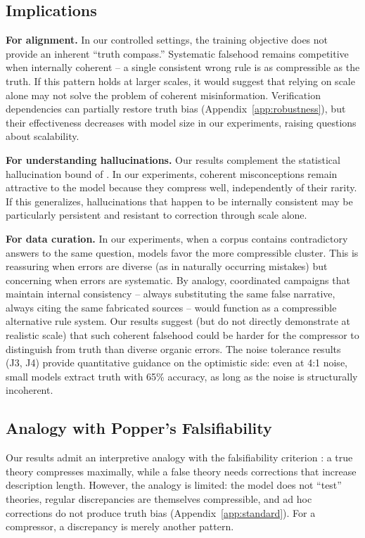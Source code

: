 \documentclass[10pt]{article} %
\begin{document}
\subsection{Implications}

\textbf{For alignment.} In our controlled settings, the training objective does not provide an inherent ``truth compass.'' Systematic falsehood remains competitive when internally coherent -- a single consistent wrong rule is as compressible as the truth. If this pattern holds at larger scales, it would suggest that relying on scale alone may not solve the problem of coherent misinformation. Verification dependencies can partially restore truth bias (Appendix~\ref{app:robustness}), but their effectiveness decreases with model size in our experiments, raising questions about scalability.

\textbf{For understanding hallucinations.} Our results complement the statistical hallucination bound of \citet{kalai2024calibrated}. In our experiments, coherent misconceptions remain attractive to the model because they compress well, independently of their rarity. If this generalizes, hallucinations that happen to be internally consistent may be particularly persistent and resistant to correction through scale alone.

\textbf{For data curation.} In our experiments, when a corpus contains contradictory answers to the same question, models favor the more compressible cluster. This is reassuring when errors are diverse (as in naturally occurring mistakes) but concerning when errors are systematic. By analogy, coordinated campaigns that maintain internal consistency -- always substituting the same false narrative, always citing the same fabricated sources -- would function as a compressible alternative rule system. Our results suggest (but do not directly demonstrate at realistic scale) that such coherent falsehood could be harder for the compressor to distinguish from truth than diverse organic errors. The noise tolerance results (J3, J4) provide quantitative guidance on the optimistic side: even at 4:1 noise, small models extract truth with 65\% accuracy, as long as the noise is structurally incoherent.

\subsection{Analogy with Popper's Falsifiability}

Our results admit an interpretive analogy with the falsifiability criterion \citep{popper1959logic}: a true theory compresses maximally, while a false theory needs corrections that increase description length. However, the analogy is limited: the model does not ``test'' theories, regular discrepancies are themselves compressible, and ad hoc corrections do not produce truth bias (Appendix~\ref{app:standard}). For a compressor, a discrepancy is merely another pattern.
\end{document}
